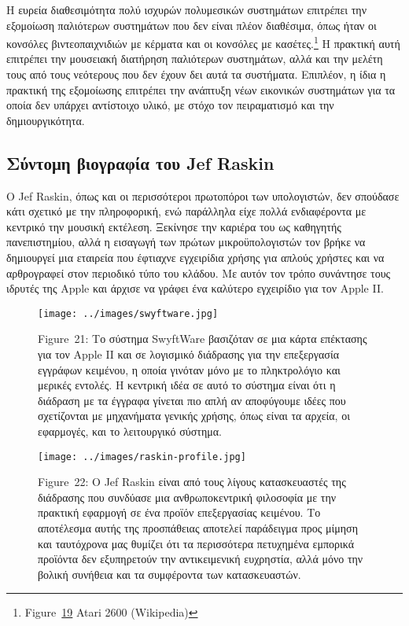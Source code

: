 \documentclass[
]{article}
\begin{document}
Η ευρεία διαθεσιμότητα πολύ ισχυρών πολυμεσικών συστημάτων επιτρέπει την
εξομοίωση παλιότερων συστημάτων που δεν είναι πλέον διαθέσιμα, όπως ήταν
οι κονσόλες βιντεοπαιχνιδιών με κέρματα και οι κονσόλες με
κασέτες.\footnote{Figure~\protect\hyperlink{fig:atari-2600}{19} Atari
  2600 (Wikipedia)} Η πρακτική αυτή επιτρέπει την μουσειακή διατήρηση
παλιότερων συστημάτων, αλλά και την μελέτη τους από τους νεότερους που
δεν έχουν δει αυτά τα συστήματα. Επιπλέον, η ίδια η πρακτική της
εξομοίωσης επιτρέπει την ανάπτυξη νέων εικονικών συστημάτων για τα οποία
δεν υπάρχει αντίστοιχο υλικό, με στόχο τον πειραματισμό και την
δημιουργικότητα.

\hypertarget{ux3c3ux3cdux3bdux3c4ux3bfux3bcux3b7-ux3b2ux3b9ux3bfux3b3ux3c1ux3b1ux3c6ux3afux3b1-ux3c4ux3bfux3c5-jef-raskin}{%
\subsection{Σύντομη βιογραφία του Jef
Raskin}\label{ux3c3ux3cdux3bdux3c4ux3bfux3bcux3b7-ux3b2ux3b9ux3bfux3b3ux3c1ux3b1ux3c6ux3afux3b1-ux3c4ux3bfux3c5-jef-raskin}}

Ο Jef Raskin, όπως και οι περισσότεροι πρωτοπόροι των υπολογιστών, δεν
σπούδασε κάτι σχετικό με την πληροφορική, ενώ παράλληλα είχε πολλά
ενδιαφέροντα με κεντρικό την μουσική εκτέλεση. Ξεκίνησε την καριέρα του
ως καθηγητής πανεπιστημίου, αλλά η εισαγωγή των πρώτων μικροϋπολογιστών
τον βρήκε να δημιουργεί μια εταιρεία που έφτιαχνε εγχειρίδια χρήσης για
απλούς χρήστες και να αρθρογραφεί στον περιοδικό τύπο του κλάδου. Με
αυτόν τον τρόπο συνάντησε τους ιδρυτές της Apple και άρχισε να γράφει
ένα καλύτερο εγχειρίδιο για τον Apple II.

\leavevmode{}%
\begin{figure}
\hypertarget{fig:swyftware}{%
\centering
\texttt{[image: ../images/swyftware.jpg]}
\caption{Figure~21: Το σύστημα SwyftWare βασιζόταν σε μια κάρτα
επέκτασης για τον Apple II και σε λογισμικό διάδρασης για την
επεξεργασία εγγράφων κειμένου, η οποία γινόταν μόνο με το πληκτρολόγιο
και μερικές εντολές. Η κεντρική ιδέα σε αυτό το σύστημα είναι ότι η
διάδραση με τα έγγραφα γίνεται πιο απλή αν αποφύγουμε ιδέες που
σχετίζονται με μηχανήματα γενικής χρήσης, όπως είναι τα αρχεία, οι
εφαρμογές, και το λειτουργικό σύστημα.}\label{fig:swyftware}
}
\end{figure}

\leavevmode{}%
\begin{figure}
\hypertarget{fig:raskin-profile}{%
\centering
\texttt{[image: ../images/raskin-profile.jpg]}
\caption{Figure~22: Ο Jef Raskin είναι από τους λίγους κατασκευαστές της
διάδρασης που συνδύασε μια ανθρωποκεντρική φιλοσοφία με την πρακτική
εφαρμογή σε ένα προϊόν επεξεργασίας κειμένου. Το αποτέλεσμα αυτής της
προσπάθειας αποτελεί παράδειγμα προς μίμηση και ταυτόχρονα μας θυμίζει
ότι τα περισσότερα πετυχημένα εμπορικά προϊόντα δεν εξυπηρετούν την
αντικειμενική ευχρηστία, αλλά μόνο την βολική συνήθεια και τα συμφέροντα
των κατασκευαστών.}\label{fig:raskin-profile}
}
\end{figure}
\end{document}
